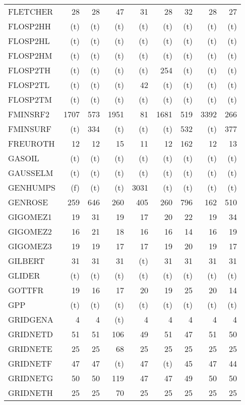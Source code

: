 \documentclass[11pt,twoside]{article}
\begin{document}
{\begin{longtable}[c]{|l|r|r|r|r|r|r|r|r|}
 FLETCHER & 28 & 28 & 47 & 31 & 28 & 32 & 28 & 27 \\
 FLOSP2HH & (t) & (t) & (t) & (t) & (t) & (t) & (t) & (t) \\
 FLOSP2HL & (t) & (t) & (t) & (t) & (t) & (t) & (t) & (t) \\
 FLOSP2HM & (t) & (t) & (t) & (t) & (t) & (t) & (t) & (t) \\
 FLOSP2TH & (t) & (t) & (t) & (t) & 254 & (t) & (t) & (t) \\
 FLOSP2TL & (t) & (t) & (t) & 42 & (t) & (t) & (t) & (t) \\
 FLOSP2TM & (t) & (t) & (t) & (t) & (t) & (t) & (t) & (t) \\
 FMINSRF2 & 1707 & 573 & 1951 & 81 & 1681 & 519 & 3392 & 266 \\
 FMINSURF & (t) & 334 & (t) & (t) & (t) & 532 & (t) & 377 \\
 FREUROTH & 12 & 12 & 15 & 11 & 12 & 162 & 12 & 13 \\
 GASOIL & (t) & (t) & (t) & (t) & (t) & (t) & (t) & (t) \\
 GAUSSELM & (t) & (t) & (t) & (t) & (t) & (t) & (t) & (t) \\
 GENHUMPS & (f) & (t) & (t) & 3031 & (t) & (t) & (t) & (t) \\
 GENROSE & 259 & 646 & 260 & 405 & 260 & 796 & 162 & 510 \\
 GIGOMEZ1 & 19 & 31 & 19 & 17 & 20 & 22 & 19 & 34 \\
 GIGOMEZ2 & 16 & 21 & 18 & 16 & 16 & 14 & 16 & 19 \\
 GIGOMEZ3 & 19 & 19 & 17 & 17 & 19 & 20 & 19 & 17 \\
 GILBERT & 31 & 31 & 31 & (t) & 31 & 31 & 31 & 31 \\
 GLIDER & (t) & (t) & (t) & (t) & (t) & (t) & (t) & (t) \\
 GOTTFR & 19 & 16 & 17 & 20 & 19 & 25 & 20 & 14 \\
 GPP & (t) & (t) & (t) & (t) & (t) & (t) & (t) & (t) \\
 GRIDGENA & 4 & 4 & (t) & 4 & 4 & 4 & 4 & 4 \\
 GRIDNETD & 51 & 51 & 106 & 49 & 51 & 47 & 51 & 50 \\
 GRIDNETE & 25 & 25 & 68 & 25 & 25 & 25 & 25 & 25 \\
 GRIDNETF & 47 & 47 & (t) & 47 & (t) & 45 & 47 & 44 \\
 GRIDNETG & 50 & 50 & 119 & 47 & 47 & 49 & 50 & 50 \\
 GRIDNETH & 25 & 25 & 70 & 25 & 25 & 25 & 25 & 25 \\

\end{longtable}}
\end{document}
